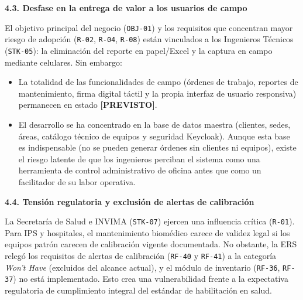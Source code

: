 \documentclass[12pt,varwidth=170mm,border=10pt]{standalone}
\newcommand{\subsectiontitle}[1]{%
  \par\vspace{1.3ex}%
  {\normalfont\large\bfseries #1\par}%
  \vspace{0.5ex}%
}
\newcommand{\estadoPrevisto}{\textcolor{mainGray}{\textbf{[PREVISTO]}}}
\begin{document}
\subsectiontitle{4.3. Desfase en la entrega de valor a los usuarios de campo}
El objetivo principal del negocio (\texttt{OBJ-01}) y los requisitos que concentran mayor riesgo de adopción (\texttt{R-02}, \texttt{R-04}, \texttt{R-08}) están vinculados a los Ingenieros Técnicos (\texttt{STK-05}): la eliminación del reporte en papel/Excel y la captura en campo mediante celulares. Sin embargo:
\begin{itemize}
  \item La totalidad de las funcionalidades de campo (órdenes de trabajo, reportes de mantenimiento, firma digital táctil y la propia interfaz de usuario responsiva) permanecen en estado \estadoPrevisto{}.
  \item El desarrollo se ha concentrado en la base de datos maestra (clientes, sedes, áreas, catálogo técnico de equipos y seguridad Keycloak). Aunque esta base es indispensable (no se pueden generar órdenes sin clientes ni equipos), existe el riesgo latente de que los ingenieros perciban el sistema como una herramienta de control administrativo de oficina antes que como un facilitador de su labor operativa.
\end{itemize}

\subsectiontitle{4.4. Tensión regulatoria y exclusión de alertas de calibración}
La Secretaría de Salud e INVIMA (\texttt{STK-07}) ejercen una influencia crítica (\texttt{R-01}). Para IPS y hospitales, el mantenimiento biomédico carece de validez legal si los equipos patrón carecen de calibración vigente documentada. No obstante, la ERS relegó los requisitos de alertas de calibración (\texttt{RF-40} y \texttt{RF-41}) a la categoría \emph{Won't Have} (excluidos del alcance actual), y el módulo de inventario (\texttt{RF-36}, \texttt{RF-37}) no está implementado. Esto crea una vulnerabilidad frente a la expectativa regulatoria de cumplimiento integral del estándar de habilitación en salud.
\end{document}
